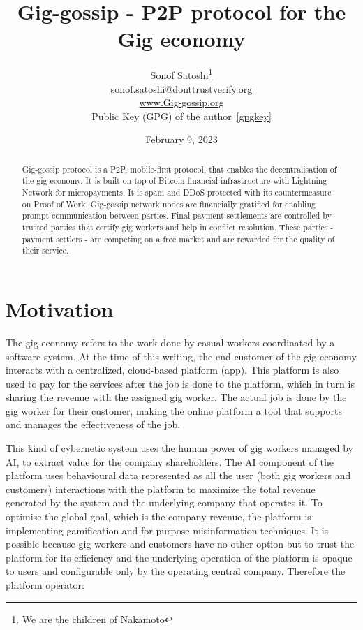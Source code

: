 \documentclass{article}
\title{Gig-gossip - P2P protocol for the Gig economy}
\date{February 9, 2023}
\author{
	{Sonof Satoshi}\thanks{We are the children of Nakamoto} \\
	\href{mailto:sonof.satoshi@donttrustverify.org}{sonof.satoshi@donttrustverify.org}\\
	\href{https://www.Gig-gossip.org}{www.Gig-gossip.org}\\
	Public Key (GPG) of the author~\ref{gpgkey} \\
}
\begin{document}
\maketitle

\begin{abstract}
Gig-gossip protocol is a P2P, mobile-first protocol, that enables the decentralisation of the gig economy. It is built on top of Bitcoin financial infrastructure with Lightning Network for micropayments. It is spam and DDoS protected with its countermeasure on Proof of Work. Gig-gossip network nodes are financially gratified for enabling prompt communication between parties. Final payment settlements are controlled by trusted parties that certify gig workers and help in conflict resolution. These parties - payment settlers - are competing on a free market and are rewarded for the quality of their service.
\end{abstract}


\section{Motivation}
The gig economy refers to the work done by casual workers coordinated by a software system. At the time of this writing, the end customer of the gig economy interacts with a centralized, cloud-based platform (app). This platform is also used to pay for the services after the job is done to the platform, which in turn is sharing the revenue with the assigned gig worker. The actual job is done by the gig worker for their customer, making the online platform a tool that supports and manages the effectiveness of the job.

This kind of cybernetic system uses the human power of gig workers managed by AI, to extract value for the company shareholders. The AI component of the platform uses behavioural data represented as all the user (both gig workers and customers) interactions with the platform to maximize the total revenue generated by the system and the underlying company that operates it. To optimise the global goal, which is the company revenue, the platform is implementing gamification and for-purpose misinformation techniques. It is possible because gig workers and customers have no other option but to trust the platform for its efficiency and the underlying operation of the platform is opaque to users and configurable only by the operating central company. Therefore the platform operator:
\end{document}
